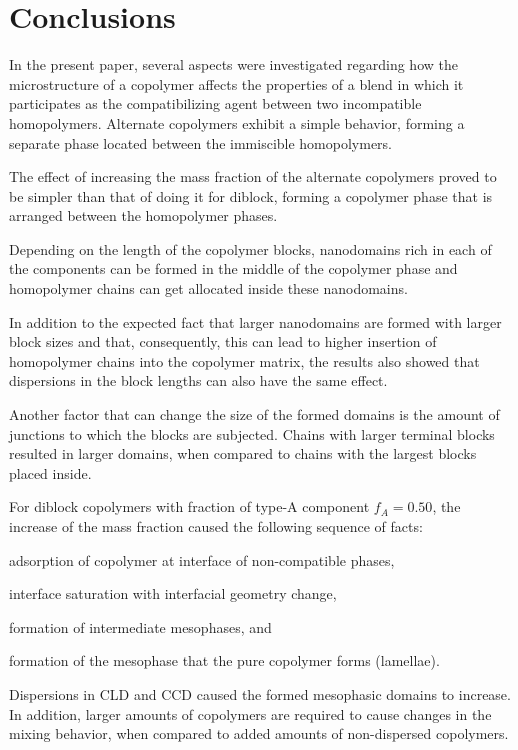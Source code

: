 \documentclass[
aip,
jcp,
reprint,
]{revtex4-1}
\begin{document}
\section{Conclusions}
\label{sec:conclusions}

In the present paper, several aspects were investigated regarding how the microstructure of a copolymer affects the properties of a blend in which it participates as the compatibilizing agent between two incompatible homopolymers.
Alternate copolymers exhibit a simple behavior, forming a separate phase located between the immiscible homopolymers.

The effect of increasing the mass fraction of the alternate copolymers proved to be simpler than that of doing it for diblock, forming a copolymer phase that is arranged between the homopolymer phases.

Depending on the length of the copolymer blocks, nanodomains rich in each of the components can be formed in the middle of the copolymer phase and homopolymer chains can get allocated inside these nanodomains.

In addition to the expected fact that larger nanodomains are formed with larger block sizes and that, consequently, this can lead to higher insertion of homopolymer chains into the copolymer matrix, the results also showed that dispersions in the block lengths can also have the same effect.

Another factor that can change the size of the formed domains is the amount of junctions to which the blocks are subjected. Chains with larger terminal blocks resulted in larger domains, when compared to chains with the largest blocks placed inside.

For diblock copolymers with fraction of type-A component $f_A=0.50$, the increase of the mass fraction caused the following sequence of facts: \begin{enumerate*}[label=\roman*)] \item adsorption of copolymer at interface of non-compatible phases, \item interface saturation with interfacial geometry change, \item formation of intermediate mesophases, and \item formation of the mesophase that the pure copolymer forms (lamellae).\end{enumerate*}

Dispersions in CLD and CCD caused the formed mesophasic domains to increase. In addition, larger amounts of copolymers are required to cause changes in the mixing behavior, when compared to added amounts of non-dispersed copolymers.
\end{document}
